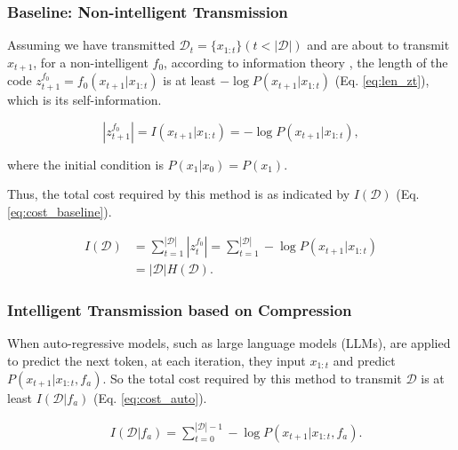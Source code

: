 \documentclass{article}
\theoremstyle{plain}
\theoremstyle{definition}
\theoremstyle{remark}
\begin{document}
\subsubsection{Baseline: Non-intelligent Transmission}

Assuming we have transmitted $\mathcal{D}_t=\{x_{1:t}\}(t<|\mathcal{D}|)$ and are about to transmit $x_{t+1}$, for a non-intelligent $f_0$, according to information theory \cite{Information_1948}, the length of the code $z_{t+1}^{f_0}=f_0(x_{t+1}|x_{1:t})$ is at least $-\log P(x_{t+1}|x_{1:t})$ (Eq. \ref{eq:len_zt}), which is its self-information.

\begin{equation}
\label{eq:len_zt}
    |z_{t+1}^{f_0}| = I(x_{t+1}|x_{1:t}) = -\log P(x_{t+1}|x_{1:t}),
\end{equation}

where the initial condition is $P(x_1|x_0)=P(x_1)$.

Thus, the total cost required by this method is as indicated by $I(\mathcal{D})$ (Eq. \ref{eq:cost_baseline}).

\begin{equation}
\label{eq:cost_baseline}
\begin{aligned}
    I(\mathcal{D}) &= \sum_{t=1}^{|\mathcal{D}|}{|z_t^{f_0}|} = \sum_{t=1}^{|\mathcal{D}|}-\log P(x_{t+1}|x_{1:t}) \\
    & =|\mathcal{D}|H(\mathcal{D}).
\end{aligned}
\end{equation}

\subsubsection{Intelligent Transmission based on Compression}

When auto-regressive models, such as large language models (LLMs), are applied to predict the next token, at each iteration, they input $x_{1:t}$ and predict $P(x_{t+1}|x_{1:t}, f_a)$. So the total cost required by this method to transmit $\mathcal{D}$ is at least $I(\mathcal{D}|f_a)$ (Eq. \ref{eq:cost_auto}).

\begin{equation}
\label{eq:cost_auto}
\begin{aligned}
    & I(\mathcal{D}|f_a) = \sum_{t=0}^{|\mathcal{D}|-1} -\log P(x_{t+1}|x_{1:t}, f_a).
\end{aligned}
\end{equation}
\end{document}
